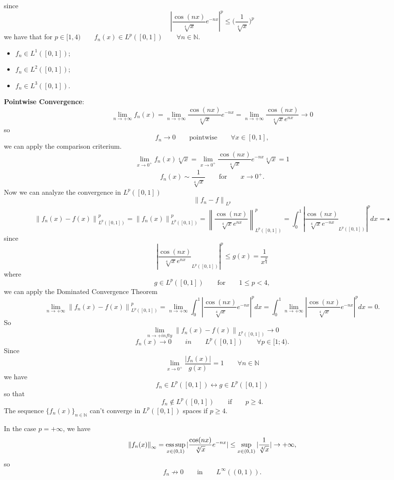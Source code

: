 \documentclass[a4paper, twoside, openany]{book}
\newcommand{\esssup}{\operatornamewithlimits{ess\,sup}}
\newcommand{\norm}[1]{\left\lVert#1\right\rVert}
\begin{document}
since
$$|\frac{\cos(nx)}{\sqrt[4]{x}} e^{-n x}|^p \leq \bigl( \frac{1}{\sqrt[4]{x}} \bigl)^p$$
we have that for $p \in [1, 4) \qquad f_n(x) \in L^p([0, 1]) \qquad \forall n \in \mathbb{N}.$
\begin{itemize}
\item $f_n \in L^1([0, 1])$;
\item $f_n \in L^2([0, 1])$;
\item $f_n \in L^3([0, 1])$.
\end{itemize}
\textbf{Pointwise Convergence}:
$$\lim_{n \rightarrow +\infty} f_n(x) = \lim_{n \rightarrow +\infty} \frac{\cos(nx)}{\sqrt[4]{x}} e^{-nx} = \lim_{n \rightarrow +\infty} \frac{\cos(nx)}{\sqrt[4]{x} e^{nx}} \rightarrow 0$$
so
$$f_n \rightarrow 0 \qquad \textrm{pointwise} \qquad \forall x \in [0,1],$$
we can apply the comparison criterium.
$$\lim_{x \rightarrow 0^+} f_n(x) \sqrt[4]{x} = \lim_{x \rightarrow 0^+} \frac{\cos(nx)}{\sqrt[4]{x}}e^{-nx} \sqrt[4]{x} = 1$$
$$f_n(x) \sim \frac{1}{\sqrt[4]{x}} \qquad \textrm{for} \qquad x \rightarrow 0^+.$$
Now we can analyze the convergence in $L^p([0, 1])$
$$\norm{f_n - f}_{L^p}$$
$$\norm{f_n(x) - f(x)}_{L^p([0, 1])}^p = \norm{f_n(x)}_{L^p([0,1])}^p = \norm{\frac{\cos(nx)}{\sqrt[4]{x} e^{nx}}}_{L^p([0,1])}^p = \int_0^1 |\frac{\cos(nx)}{\sqrt[4]{x} e^{-nx}}_{L^p([0,1])}|^p dx = \star$$
since
$$|\frac{\cos(nx)}{\sqrt[4]{x} e^{nx}}_{L^p([0,1])}|^p \leq g(x) = \frac{1}{x^{\frac{p}{4}}}$$
where
$$g \in L^p([0,1]) \qquad \textrm{for} \qquad 1 \leq p < 4,$$
we can apply the Dominated Convergence Theorem
$$\lim_{n \rightarrow +\infty} \norm{f_n(x) - f(x)}_{L^p([0, 1])}^p = \lim_{n \rightarrow +\infty} \int_0^1 |\frac{\cos(nx)}{\sqrt[4]{x}}e^{-nx}|^p dx = \int_0^1 \lim_{n \rightarrow +\infty} |\frac{\cos(nx)}{\sqrt[4]{x}} e^{-nx}|^p dx = 0.$$	
So
$$\lim_{n \rightarrow +infty} \norm{f_n(x) - f(x)}_{L^p([0, 1])} \rightarrow 0$$
$$f_n(x) \rightarrow 0 \qquad in \qquad L^p([0, 1]) \qquad \forall p \in [1; 4).$$
Since
$$\lim_{x \rightarrow 0^+} \frac{|f_n(x)|}{g(x)} = 1 \qquad \forall n \in \mathbb{N}$$
we have
$$f_n \in L^p([0, 1]) \leftrightarrow g \in L^p([0, 1])$$
so that
$$f_n \notin L^p([0, 1]) \qquad \textrm{if} \qquad p \geq 4.$$
The sequence $\{ f_n(x) \}_{n \in \mathbb{N}}$ can't converge in $L^p([0, 1])$ spaces if $p \geq 4$. \par 
In the case $p = +\infty$, we have
$$\norm{f_n(x)}_{\infty} = \esssup_{x \in (0, 1)} |\frac{\cos(nx)}{\sqrt[4]{x}}e^{-nx}| \leq \sup_{x \in (0,1)} |\frac{1}{\sqrt[4]{x}}| \rightarrow +\infty,$$
so
$$f_n \nrightarrow 0 \qquad \textrm{in} \qquad L^{\infty}((0, 1)).$$		
\end{document}
